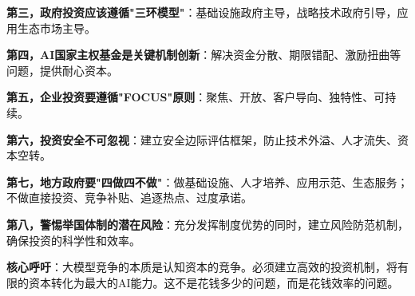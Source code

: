 \textbf{第三，政府投资应该遵循"三环模型"}：基础设施政府主导，战略技术政府引导，应用生态市场主导。

\textbf{第四，AI国家主权基金是关键机制创新}：解决资金分散、期限错配、激励扭曲等问题，提供耐心资本。

\textbf{第五，企业投资要遵循"FOCUS"原则}：聚焦、开放、客户导向、独特性、可持续。

\textbf{第六，投资安全不可忽视}：建立安全边际评估框架，防止技术外溢、人才流失、资本空转。

\textbf{第七，地方政府要"四做四不做"}：做基础设施、人才培养、应用示范、生态服务；不做直接投资、竞争补贴、追逐热点、过度承诺。

\textbf{第八，警惕举国体制的潜在风险}：充分发挥制度优势的同时，建立风险防范机制，确保投资的科学性和效率。

\textbf{核心呼吁}：大模型竞争的本质是认知资本的竞争。必须建立高效的投资机制，将有限的资本转化为最大的AI能力。这不是花钱多少的问题，而是花钱效率的问题。

